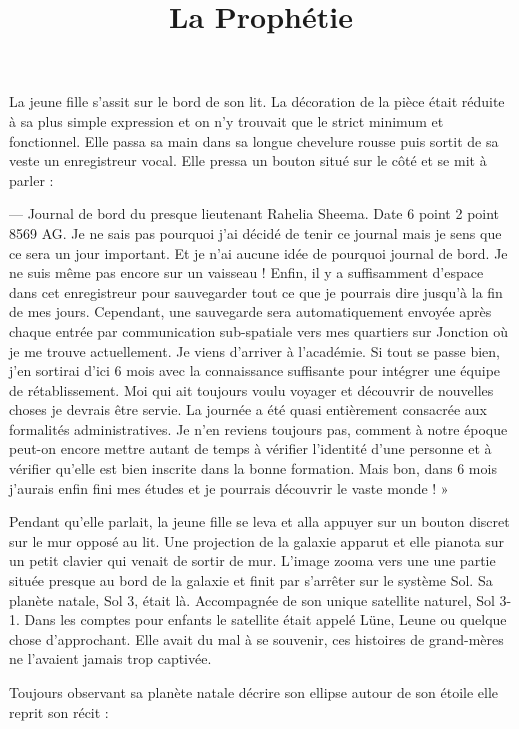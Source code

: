 \documentclass[ebook,12pt,oneside,onecolumn,openright,draft]{memoir}
\title{La Prophétie}
\author{}
\begin{document}
\maketitle

La jeune fille s'assit sur le bord de son lit. La décoration de la pièce était
réduite à sa plus simple expression et on n'y trouvait que le strict minimum et
fonctionnel. Elle passa sa main dans sa longue chevelure rousse puis sortit de
sa veste un enregistreur vocal. Elle pressa un bouton situé sur le côté et se
mit à parler :

— Journal de bord du presque lieutenant Rahelia Sheema. Date 6 point 2 point
8569 AG. Je ne sais pas pourquoi j'ai décidé de tenir ce journal mais je sens
que ce sera un jour important. Et je n'ai aucune idée de pourquoi journal de
bord. Je ne suis même pas encore sur un vaisseau ! Enfin, il y a suffisamment
d'espace dans cet enregistreur pour sauvegarder tout ce que je pourrais dire
jusqu'à la fin de mes jours. Cependant, une sauvegarde sera automatiquement
envoyée après chaque entrée par communication sub-spatiale vers mes quartiers
sur Jonction où je me trouve actuellement. Je viens d'arriver à l'académie. Si
tout se passe bien, j'en sortirai d'ici 6 mois avec la connaissance suffisante
pour intégrer une équipe de rétablissement. Moi qui ait toujours voulu voyager
et découvrir de nouvelles choses je devrais être servie. La journée a été quasi
entièrement consacrée aux formalités administratives. Je n'en reviens toujours
pas, comment à notre époque peut-on encore mettre autant de temps à vérifier
l'identité d'une personne et à vérifier qu'elle est bien inscrite dans la bonne
formation. Mais bon, dans 6 mois j'aurais enfin fini mes études et je pourrais
découvrir le vaste monde ! »

Pendant qu'elle parlait, la jeune fille se leva et alla appuyer sur un bouton
discret sur le mur opposé au lit. Une projection de la galaxie apparut et elle
pianota sur un petit clavier qui venait de sortir de mur. L'image zooma vers une
une partie située presque au bord de la galaxie et finit par s'arrêter sur le
système Sol. Sa planète natale, Sol 3, était là. Accompagnée de son unique
satellite naturel, Sol 3-1. Dans les comptes pour enfants le satellite était
appelé Lüne, Leune ou quelque chose d'approchant. Elle avait du mal à se
souvenir, ces histoires de grand-mères ne l'avaient jamais trop captivée.

Toujours observant sa planète natale décrire son ellipse autour de son étoile
elle reprit son récit :
\end{document}
